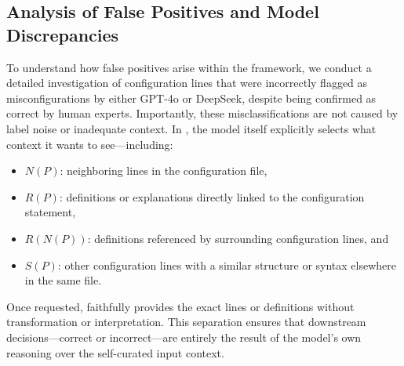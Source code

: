 \subsection{Analysis of False Positives and Model Discrepancies}
\label{subsec:analysis}

To understand how false positives arise within the \sysname{} framework, we conduct a detailed investigation of configuration lines that were incorrectly flagged as misconfigurations by either GPT-4o or DeepSeek, despite being confirmed as correct by human experts. Importantly, these misclassifications are not caused by label noise or inadequate context.  In \sysname{}, the model itself explicitly selects what context it wants to see—including:

\begin{itemize}
    \item $N(P)$: neighboring lines in the configuration file,
    \item $R(P)$: definitions or explanations directly linked to the configuration statement,
    \item $R(N(P))$: definitions referenced by surrounding configuration lines, and
    \item $S(P)$: other configuration lines with a similar structure or syntax elsewhere in the same file.
\end{itemize}
 

Once requested, \sysname{} faithfully provides the exact lines or definitions without transformation or interpretation. This separation ensures that downstream decisions—correct or incorrect—are entirely the result of the model’s own reasoning over the self-curated input context.

